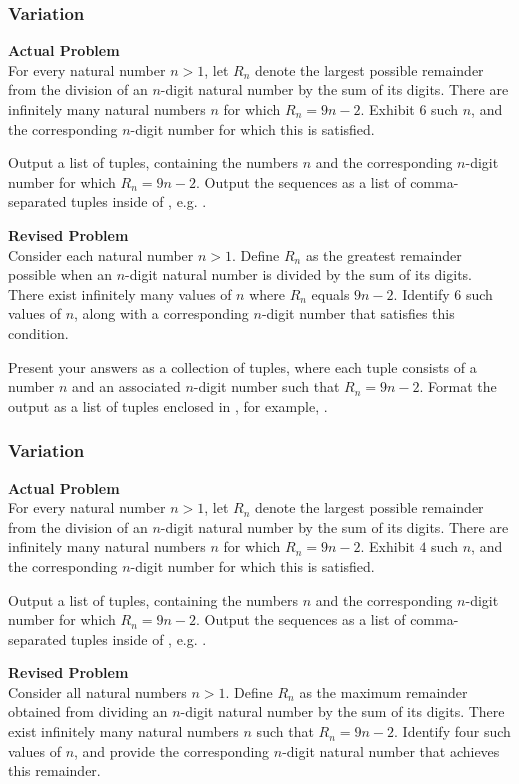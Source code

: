 \subsubsection{Variation}
\textbf{Actual Problem}\\
For every natural number $n > 1$, let $R_{n}$ denote the largest possible remainder from the division of an $n$-digit natural number by the sum of its digits. There are infinitely many natural numbers $n$ for which $R_{n} = 9 n - 2$. Exhibit $6$ such $n$, and the corresponding $n$-digit number for which this is satisfied.

Output a list of tuples, containing the numbers $n$ and the corresponding $n$-digit number for which $R_{n} = 9 n - 2$. Output the sequences as a list of comma-separated tuples inside of \boxed, e.g. .

\textbf{Revised Problem}\\
Consider each natural number $n > 1$. Define $R_{n}$ as the greatest remainder possible when an $n$-digit natural number is divided by the sum of its digits. There exist infinitely many values of $n$ where $R_{n}$ equals $9n - 2$. Identify 6 such values of $n$, along with a corresponding $n$-digit number that satisfies this condition.

Present your answers as a collection of tuples, where each tuple consists of a number $n$ and an associated $n$-digit number such that $R_{n} = 9n - 2$. Format the output as a list of tuples enclosed in \boxed, for example, .

\subsubsection{Variation}
\textbf{Actual Problem}\\
For every natural number $n > 1$, let $R_{n}$ denote the largest possible remainder from the division of an $n$-digit natural number by the sum of its digits. There are infinitely many natural numbers $n$ for which $R_{n} = 9 n - 2$. Exhibit $4$ such $n$, and the corresponding $n$-digit number for which this is satisfied.

Output a list of tuples, containing the numbers $n$ and the corresponding $n$-digit number for which $R_{n} = 9 n - 2$. Output the sequences as a list of comma-separated tuples inside of \boxed, e.g. .

\textbf{Revised Problem}\\
Consider all natural numbers \( n > 1 \). Define \( R_n \) as the maximum remainder obtained from dividing an \( n \)-digit natural number by the sum of its digits. There exist infinitely many natural numbers \( n \) such that \( R_n = 9n - 2 \). Identify four such values of \( n \), and provide the corresponding \( n \)-digit natural number that achieves this remainder.

